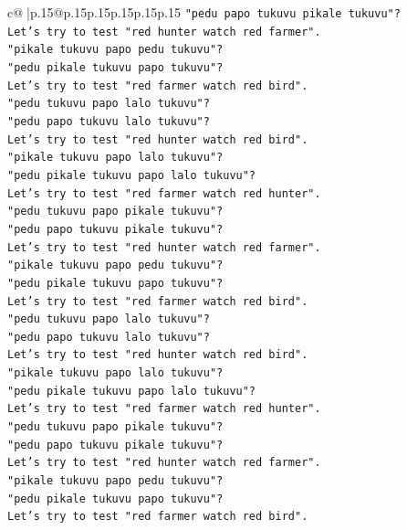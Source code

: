\documentclass{article}
\begin{document}
{\begin{supertabular}{c@{$\;$}|p{.15\linewidth}@{}p{.15\linewidth}p{.15\linewidth}p{.15\linewidth}p{.15\linewidth}p{.15\linewidth}}
{{{\texttt{"pedu papo tukuvu pikale tukuvu"?} \\
\texttt{Let's try to test "red hunter watch red farmer".} \\
\texttt{"pikale tukuvu papo pedu tukuvu"?} \\
\texttt{"pedu pikale tukuvu papo tukuvu"?} \\
\texttt{Let's try to test "red farmer watch red bird".} \\
\texttt{"pedu tukuvu papo lalo tukuvu"?} \\
\texttt{"pedu papo tukuvu lalo tukuvu"?} \\
\texttt{Let's try to test "red hunter watch red bird".} \\
\texttt{"pikale tukuvu papo lalo tukuvu"?} \\
\texttt{"pedu pikale tukuvu papo lalo tukuvu"?} \\
\texttt{Let's try to test "red farmer watch red hunter".} \\
\texttt{"pedu tukuvu papo pikale tukuvu"?} \\
\texttt{"pedu papo tukuvu pikale tukuvu"?} \\
\texttt{Let's try to test "red hunter watch red farmer".} \\
\texttt{"pikale tukuvu papo pedu tukuvu"?} \\
\texttt{"pedu pikale tukuvu papo tukuvu"?} \\
\texttt{Let's try to test "red farmer watch red bird".} \\
\texttt{"pedu tukuvu papo lalo tukuvu"?} \\
\texttt{"pedu papo tukuvu lalo tukuvu"?} \\
\texttt{Let's try to test "red hunter watch red bird".} \\
\texttt{"pikale tukuvu papo lalo tukuvu"?} \\
\texttt{"pedu pikale tukuvu papo lalo tukuvu"?} \\
\texttt{Let's try to test "red farmer watch red hunter".} \\
\texttt{"pedu tukuvu papo pikale tukuvu"?} \\
\texttt{"pedu papo tukuvu pikale tukuvu"?} \\
\texttt{Let's try to test "red hunter watch red farmer".} \\
\texttt{"pikale tukuvu papo pedu tukuvu"?} \\
\texttt{"pedu pikale tukuvu papo tukuvu"?} \\
\texttt{Let's try to test "red farmer watch red bird".} \\
}}}
\end{supertabular}}
\end{document}
